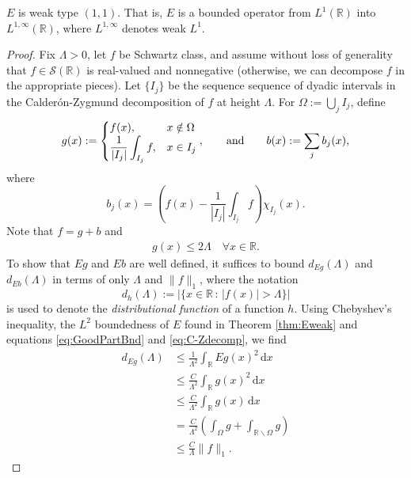 \documentclass[../dissertation.tex]{subfiles}
\begin{document}
\begin{thm}\label{thm:Eweak}
	$E$ is weak type $(1, 1)$. That is, $E$ is a bounded operator from 
    $L^1(\mathbb R)$ into
    $L^{1, \infty}(\mathbb R)$, where  $L^{1, \infty}$ denotes weak $L^1$.
\end{thm}
\begin{proof}
    Fix $\Lambda > 0$, let $f$ be Schwartz class, and assume without loss of 
    generality that $f \in \mathscr S(\mathbb R)$ is real-valued and nonnegative 
    (otherwise, we can decompose $f$ in the appropriate pieces).
    Let $\{ I_j \}$ be the sequence sequence of dyadic intervals in the 
    Calder\'on-Zygmund decomposition of 
    $f$ at height $\Lambda$. For $\Omega := \bigcup_j I_j$, define 
    \begin{align}\label{eq:C-Zdecomp}
        g(x) :=  
            \begin{cases}
                \displaystyle f(x), & x \notin \Omega \\[0.5\baselineskip]
                \displaystyle \frac{1}{|I_j|} \int_{I_j} f, & x \in I_j
            \end{cases},
        \qquad \text{and} \qquad
        b(x) := \sum_j b_j(x),
    \end{align}
    where 
    \[
        b_j(x) = \left( f(x) - \dfrac{1}{|I_j|} \int_{I_j} f \right) \chi_{I_j}(x).
    \]
    Note that $f = g+b$ and
    \begin{align} \label{eq:GoodPartBnd}
        g(x) \leq 2 \Lambda \quad \forall x \in \mathbb R.
    \end{align}
    To show that $Eg$ and $Eb$ are well defined, it suf{}fices
    to bound $d_{Eg}(\Lambda)$ and $d_{Eb}(\Lambda)$ in terms of only $\Lambda$ and 
    $\|f\|_1$, where
    the notation 
    \[
        d_h (\Lambda) := \big| \big\{ x \in \mathbb R \, : \, |f(x)| > \Lambda \big\} \big|
    \]
    is used to denote the \textit{distributional function} of a function $h$. Using
    Chebyshev's inequality, the $L^2$  boundedness of $E$ found in Theorem \ref{thm:Eweak}
    and equations \eqref{eq:GoodPartBnd} and \eqref{eq:C-Zdecomp}, we find
    \begin{align}\label{eq:dEgBound}
        d_{Eg}(\Lambda)
            &\leq \frac{1}{\Lambda^2} \int_{\mathbb R} E g(x)^2 \, \mathrm{d}x \\
            &\leq \frac{C}{\Lambda^2} \int_{\mathbb R} g(x)^2 \, \mathrm{d}x \nonumber\\
            &\leq \frac{C}{\Lambda^2} \int_{\mathbb R} g(x) \, \mathrm{d}x \nonumber\\
            &= \frac{C}{\Lambda^2} \left( \int_{\Omega} g 
                + \int_{\mathbb{R} \backslash \Omega} g  \right) \nonumber\\
            &\leq \frac{C}{\Lambda} \| f \|_1.  \nonumber
    \end{align}



\end{proof}
\end{document}
